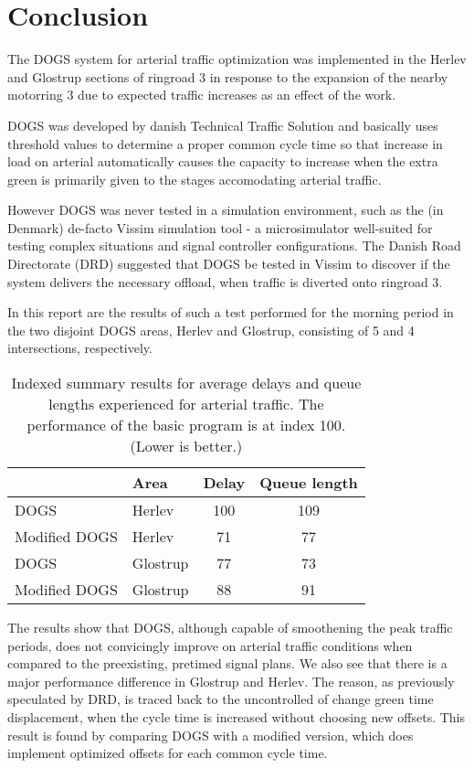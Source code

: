 \section{Conclusion}
\label{conclusion}

The DOGS system for arterial traffic optimization was implemented in the Herlev and Glostrup sections of ringroad 3 in response to the expansion of the nearby motorring 3 due to expected traffic increases as an effect of the work.

DOGS was developed by danish Technical Traffic Solution and basically uses threshold values to determine a proper common cycle time so that increase in load on arterial automatically causes the capacity to increase when the extra green is primarily given to the stages accomodating arterial traffic.

However DOGS was never tested in a simulation environment, such as the (in Denmark) de-facto Vissim simulation tool - a microsimulator well-suited for testing complex situations and signal controller configurations.
The Danish Road Directorate (DRD) suggested that DOGS be tested in Vissim to discover if the system delivers the necessary offload, when traffic is diverted onto ringroad 3.

In this report are the results of such a test performed for the morning period in the two disjoint DOGS areas, Herlev and Glostrup, consisting of 5 and 4 intersections, respectively. 

\begin{table}[ht]
\centering
\begin{tabular}{l|l|c|c}
& \textbf{Area} & \textbf{Delay} & \textbf{Queue length} \\ \hline
DOGS & Herlev & 100 & 109 \\
Modified DOGS & Herlev & 71 & 77 \\
DOGS & Glostrup & 77 &  73 \\
Modified DOGS & Glostrup & 88 & 91
\end{tabular}
\caption{Indexed summary results for average delays and queue lengths experienced for arterial traffic. The performance of the basic program is at index 100. (Lower is better.)}
\label{tab:result_summary}
\end{table}

The results show that DOGS, although capable of smoothening the peak traffic periods, does not convicingly improve on arterial traffic conditions when compared to the preexisting, pretimed signal plans. We also see that there is a major performance difference in Glostrup and Herlev.
The reason, as previously speculated by DRD, is traced back to the uncontrolled of change green time displacement, when the cycle time is increased without choosing new offsets. This result is found by comparing DOGS with a modified version, which does implement optimized offsets for each common cycle time.

